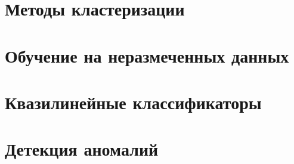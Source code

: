 \documentclass{disser}
\theoremstyle{definition}
\theoremstyle{definition}
\theoremstyle{definition}
\theoremstyle{remark}
\theoremstyle{remark}
\begin{document}
    \clearpage
    \chapter{Методы кластеризации}
    

    \clearpage
    \chapter{Обучение на неразмеченных данных}
    

    \clearpage
    \chapter{Квазилинейные классификаторы}
    

    \clearpage
    \chapter{Детекция аномалий}
    


    \clearpage
    \printbibliography
\end{document}
